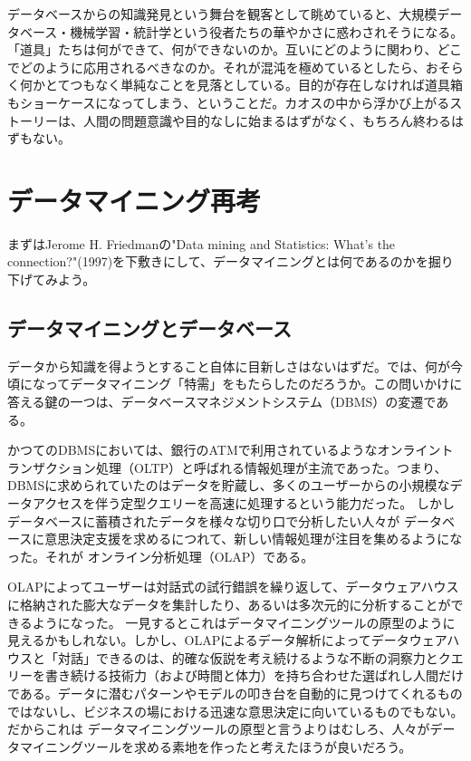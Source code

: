 データベースからの知識発見という舞台を観客として眺めていると、大規模データベース・機械学習・統計学という役者たちの華やかさに惑わされそうになる。「道具」たちは何ができて、何ができないのか。互いにどのように関わり、どこでどのように応用されるべきなのか。それが混沌を極めているとしたら、おそらく何かとてつもなく単純なことを見落としている。目的が存在しなければ道具箱もショーケースになってしまう、ということだ。カオスの中から浮かび上がるストーリーは、人間の問題意識や目的なしに始まるはずがなく、もちろん終わるはずもない。

\section{データマイニング再考}
まずはJerome H. Friedmanの"Data mining and Statistics: What's the connection?"(1997)を下敷きにして、データマイニングとは何であるのかを掘り下げてみよう。

\subsection{データマイニングとデータベース}
データから知識を得ようとすること自体に目新しさはないはずだ。では、何が今頃になってデータマイニング「特需」をもたらしたのだろうか。この問いかけに答える鍵の一つは、データベースマネジメントシステム（DBMS）の変遷である。

かつてのDBMSにおいては、銀行のATMで利用されているようなオンライントランザクション処理（OLTP）と呼ばれる情報処理が主流であった。つまり、DBMSに求められていたのはデータを貯蔵し、多くのユーザーからの小規模なデータアクセスを伴う定型クエリーを高速に処理するという能力だった。
しかしデータベースに蓄積されたデータを様々な切り口で分析したい人々が
データベースに意思決定支援を求めるにつれて、新しい情報処理が注目を集めるようになった。それが
オンライン分析処理（OLAP）である。

OLAPによってユーザーは対話式の試行錯誤を繰り返して、データウェアハウスに格納された膨大なデータを集計したり、あるいは多次元的に分析することができるようになった。
一見するとこれはデータマイニングツールの原型のように見えるかもしれない。しかし、OLAPによるデータ解析によってデータウェアハウスと「対話」できるのは、的確な仮説を考え続けるような不断の洞察力とクエリーを書き続ける技術力（および時間と体力）を持ち合わせた選ばれし人間だけである。データに潜むパターンやモデルの叩き台を自動的に見つけてくれるものではないし、ビジネスの場における迅速な意思決定に向いているものでもない。だからこれは
データマイニングツールの原型と言うよりはむしろ、人々がデータマイニングツールを求める素地を作ったと考えたほうが良いだろう。

